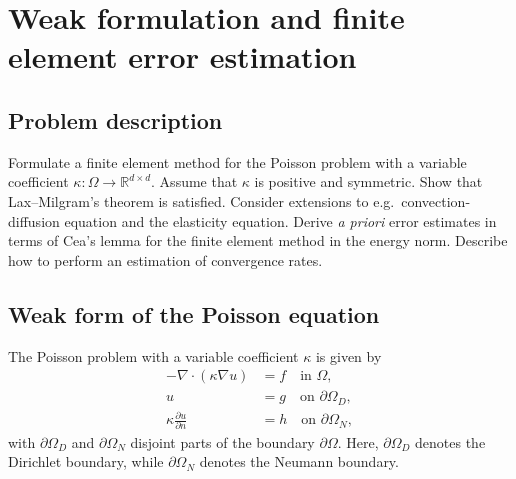 \section{Weak formulation and finite element error estimation}
\subsection*{Problem description}
Formulate a finite element method for the Poisson problem with a variable coefficient $\kappa : \Omega \to \mathbb{R}^{d \times d}$.
Assume that $\kappa$ is positive and symmetric.
Show that Lax--Milgram's theorem is satisfied. %
Consider extensions to e.g.\ convection-diffusion equation and the elasticity equation.
Derive \textit{a priori} error estimates in terms of Cea's lemma for the finite element method in the energy norm.
Describe how to perform an estimation of convergence rates.

\subsection{Weak form of the Poisson equation}
The Poisson problem with a variable coefficient $\kappa$ is given by
\begin{equation}
    \begin{split}
        -\nabla \cdot (\kappa \nabla u) &= f \quad \text{in } \Omega, \\
        u &= g \quad \text{on } \partial\Omega_D, \\
        \kappa \frac{\partial u}{\partial n} &= h \quad \text{on } \partial\Omega_N,
    \end{split}
\end{equation}
with $\partial\Omega_D$ and $\partial\Omega_N$ disjoint parts of the boundary $\partial\Omega$.
Here, $\partial\Omega_D$ denotes the Dirichlet boundary, while $\partial\Omega_N$ denotes the Neumann boundary.

